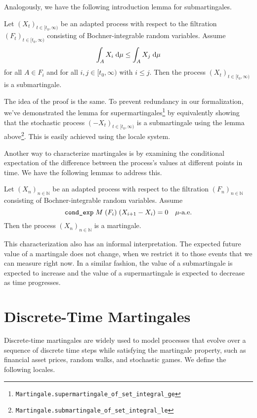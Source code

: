 Analogously, we have the following introduction lemma for submartingales.

\begin{lemma}
	Let $(X_t)_{t \in [t_0,\infty)}$ be an adapted process with respect to the filtration $(F_t)_{t \in [t_0,\infty)}$ consisting of Bochner-integrable random variables.
  Assume 
  \[
  \normalfont \int_A X_i \;\textrm{d}\mu \le \int_A X_j \;\textrm{d}\mu
  \] 
  for all $A \in F_i$ and for all $i,j \in [t_0,\infty)$ with $i \le j$. Then the process $(X_t)_{t \in [t_0,\infty)}$ is a submartingale.
\end{lemma}

The idea of the proof is the same. To prevent redundancy in our formalization, we've demonstrated the lemma for supermartingales\footnote{\texttt{Martingale.supermartingale\_of\_set\_integral\_ge}} by equivalently showing that the stochastic process $(-X_t)_{t \in [t_0,\infty)}$ is a submartingale using the lemma above\footnote{\texttt{Martingale.submartingale\_of\_set\_integral\_le}}. This is easily achieved using the locale system.

Another way to characterize martingales is by examining the conditional expectation of the difference between the process's values at different points in time. We have the following lemmas to address this.

\begin{lemma}
  Let $(X_n)_{n \in \mathbb{N}}$ be an adapted process with respect to the filtration $(F_n)_{n \in \mathbb{N}}$ consisting of Bochner-integrable random variables. Assume 
  \[
  \normalfont \texttt{cond\_exp} \; M \; (F_i) \; (X_{i+1} - X_i) = 0 \quad\mu\textrm{-a.e.}
  \] 
  Then the process $(X_n)_{n \in \mathbb{N}}$ is a martingale.
\end{lemma}

This characterization also has an informal interpretation. The expected future value of a martingale does not change, when we restrict it to those events that we can measure right now. In a similar fashion, the value of a submartingale is expected to increase and the value of a supermartingale is expected to decrease as time progresses.

\section{Discrete-Time Martingales}

Discrete-time martingales are widely used to model processes that evolve over a sequence of discrete time steps while satisfying the martingale property, such as financial asset prices, random walks, and stochastic games. We define the following locales.

